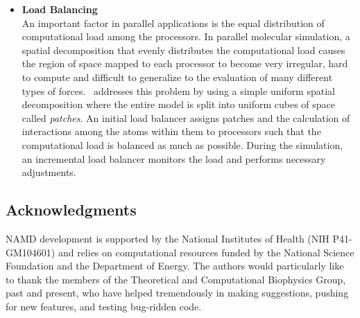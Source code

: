 \begin{itemize}
\item{\bf Load Balancing}\\
An important factor in parallel applications is the equal distribution
of computational load among the processors. In parallel molecular simulation,
a spatial decomposition that evenly distributes the computational load
causes the region of space mapped to each processor to become very irregular, 
hard to compute and difficult to generalize to the evaluation of many different
types of forces.  \NAMD\ addresses this problem by using a simple uniform 
spatial decomposition where the entire model is split into uniform cubes of 
space called {\em patches}. An initial load balancer assigns patches
and the calculation of interactions among the atoms within them
to processors such that the computational load is balanced as much as possible.
During the simulation, an incremental load balancer monitors the load
and performs necessary adjustments.

\end{itemize}

\subsection{Acknowledgments}

NAMD development is supported by
the National Institutes of Health (NIH P41-GM104601)
and relies on computational resources funded by
the National Science Foundation and the Department of Energy.
\prettypar
The authors would particularly like to thank the members of the
Theoretical and Computational Biophysics Group, past and present, who have helped
tremendously in making suggestions, pushing for new features, and
testing bug-ridden code.

